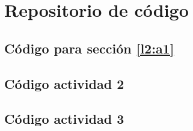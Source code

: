 \chapter{Repositorio de código}
\label{ap:osc}
\section{Código para sección \ref{l2:a1}}
\label{ApendiceA1}

{\scriptsize 
    
}



\section{Código actividad 2}
\label{ApendiceA1}
{\scriptsize 
    
}	


\section{Código actividad 3}

{\scriptsize 
    
}